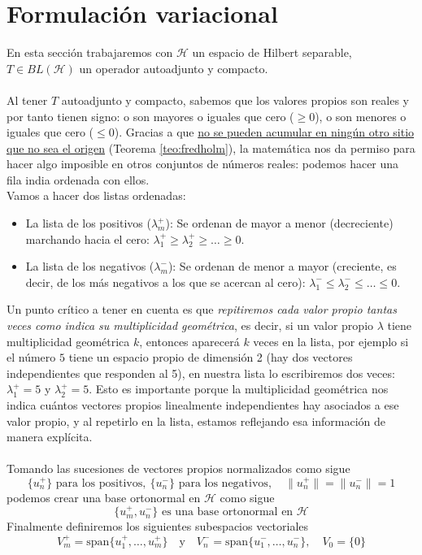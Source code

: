 \section{Formulación variacional}
\noindent
En esta sección trabajaremos con $\mathcal{H}$ un espacio de Hilbert separable, $T\in BL(\mathcal{H})$ un operador autoadjunto y compacto. \\ \\
\noindent
Al tener $T$ autoadjunto y compacto, sabemos que los valores propios son reales y por tanto tienen signo: o son mayores o iguales que cero ($\geq 0$), o son menores o iguales que cero ($\leq 0$). Gracias a que \underline{no se pueden acumular en ningún otro sitio que no sea el origen} (Teorema \ref{teo:fredholm}), la matemática nos da permiso para hacer algo imposible en otros conjuntos de números reales: podemos hacer una fila india ordenada con ellos. \\
\noindent
Vamos a hacer dos listas ordenadas:
\begin{itemize}
    \item La lista de los positivos ($\lambda_m^+$): Se ordenan de mayor a menor (decreciente) marchando hacia el cero: $\lambda_1^+ \geq \lambda_2^+ \geq \dots \geq 0$.
    \item La lista de los negativos ($\lambda_m^-$): Se ordenan de menor a mayor (creciente, es decir, de los más negativos a los que se acercan al cero): $\lambda_1^- \leq \lambda_2^- \leq \dots \leq 0$.
\end{itemize}
Un punto crítico a tener en cuenta es que \textit{repitiremos cada valor propio tantas veces como indica su multiplicidad geométrica}, es decir, si un valor propio $\lambda$ tiene multiplicidad geométrica $k$, entonces aparecerá $k$ veces en la lista, por ejemplo si el número $5$ tiene un espacio propio de dimensión 2 (hay dos vectores independientes que responden al 5), en nuestra lista lo escribiremos dos veces: $\lambda_1^+ = 5$ y $\lambda_2^+ = 5$. Esto es importante porque la multiplicidad geométrica nos indica cuántos vectores propios linealmente independientes hay asociados a ese valor propio, y al repetirlo en la lista, estamos reflejando esa información de manera explícita. \\ \\

\noindent
Tomando las sucesiones de vectores propios normalizados como sigue
\begin{equation*}
    \{u_n^+\} \text{ para los positivos}, \ \{u_n^-\} \text{ para los negativos}, \quad \|u_n^+\| = \|u_n^-\| = 1
\end{equation*}
podemos crear una base ortonormal en $\mathcal{H}$ como sigue
\begin{equation*}
    \{u_m^+, u_n^-\} \text{ es una base ortonormal en } \mathcal{H}
\end{equation*}
Finalmente definiremos los siguientes subespacios vectoriales
\begin{equation*}
    V_m^+ = \text{span}\{u_1^+, \dots, u_m^+\} \quad \text{y} \quad V_n^- = \text{span}\{u_1^-, \dots, u_n^-\}, \quad V_0 = \{0\}
\end{equation*}
    
